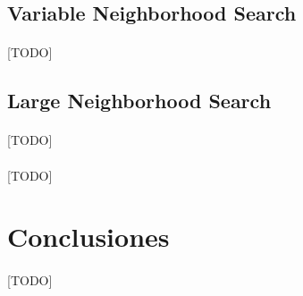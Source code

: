 \documentclass{subfiles}
\begin{document}
      \subsection{Variable Neighborhood Search}
      \label{sec:solving_vns}

        \paragraph{}
        [TODO]

      \subsection{Large Neighborhood Search}
      \label{sec:solving_lns}

        \paragraph{}
        [TODO]

      \paragraph{}
      [TODO]

    \section{Conclusiones}
    \label{sec:solving_conclusions}

      \paragraph{}
      [TODO]
\end{document}
